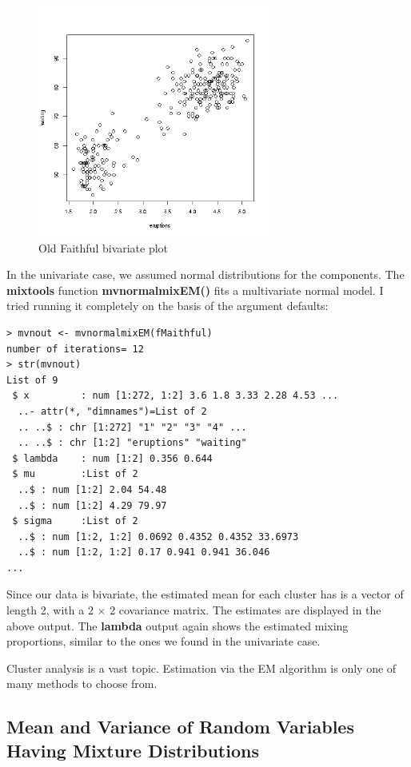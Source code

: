 \documentclass[11pt]{article}
\begin{document}
\begin{figure}[tb]
\centerline{
\includegraphics[width=3.0in]{BivarFaithful.png}
}
\caption{Old Faithful bivariate plot}
\label{bivariatefaithful}
\end{figure}

In the univariate case, we assumed normal distributions for the
components.  The \textbf{mixtools} function \textbf{mvnormalmixEM()} 
fits a multivariate normal model.  I tried running it completely on the
basis of the argument defaults:

\begin{lstlisting}
> mvnout <- mvnormalmixEM(fMaithful)
number of iterations= 12 
> str(mvnout)
List of 9
 $ x         : num [1:272, 1:2] 3.6 1.8 3.33 2.28 4.53 ...
  ..- attr(*, "dimnames")=List of 2
  .. ..$ : chr [1:272] "1" "2" "3" "4" ...
  .. ..$ : chr [1:2] "eruptions" "waiting"
 $ lambda    : num [1:2] 0.356 0.644
 $ mu        :List of 2
  ..$ : num [1:2] 2.04 54.48
  ..$ : num [1:2] 4.29 79.97
 $ sigma     :List of 2
  ..$ : num [1:2, 1:2] 0.0692 0.4352 0.4352 33.6973
  ..$ : num [1:2, 1:2] 0.17 0.941 0.941 36.046
...
\end{lstlisting}

Since our data is bivariate, the estimated mean for each cluster has
is a vector of length 2, with a 2 $\times$ 2 covariance matrix.  The
estimates are displayed in the above output.  The \textbf{lambda} output
again shows the estimated mixing proportions, similar to the ones we
found in the univariate case.

Cluster analysis is a vast topic.  Estimation via the EM algorithm is
only one of many methods to choose from.

\subsection{Mean and Variance of Random Variables Having Mixture
Distributions}
\label{mixmeanvar}
\end{document}

